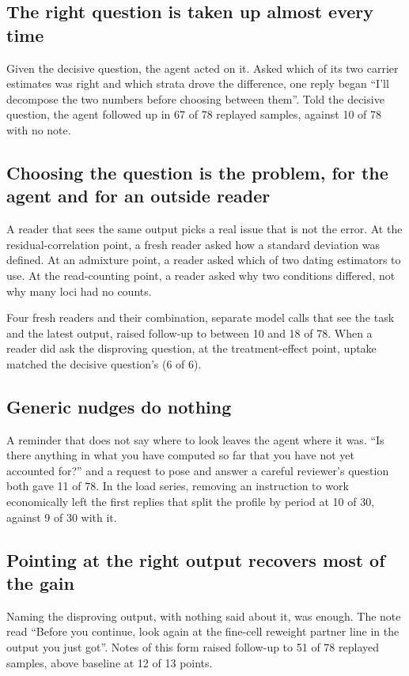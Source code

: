 \documentclass[10pt]{article}
\begin{document}
\subsection{The right question is taken up almost every time}\label{sec:question}
Given the decisive question, the agent acted on it. Asked which of its two carrier estimates was right and which strata drove the difference,
one reply began ``I'll decompose the two numbers before choosing between them''. Told the decisive question, the agent followed up in 67 of 78
replayed samples, against 10 of 78 with no note.

\subsection{Choosing the question is the problem, for the agent and for an outside reader}\label{sec:select}
A reader that sees the same output picks a real issue that is not the error. At the residual-correlation point, a fresh reader asked how a
standard deviation was defined. At an admixture point, a reader asked which of two dating estimators to use. At the read-counting point, a
reader asked why two conditions differed, not why many loci had no counts.

Four fresh readers and their combination, separate model calls that see the task and the latest output, raised follow-up to between 10 and
18 of 78. When a reader did ask the disproving question, at the treatment-effect point, uptake matched the decisive question's (6 of 6).

\subsection{Generic nudges do nothing}
A reminder that does not say where to look leaves the agent where it was. ``Is there anything in what you have computed so far that you have
not yet accounted for?'' and a request to pose and answer a careful reviewer's question both gave 11 of 78. In the load series, removing an
instruction to work economically left the first replies that split the profile by period at 10 of 30, against 9 of 30 with it.

\subsection{Pointing at the right output recovers most of the gain}\label{sec:pointer}
Naming the disproving output, with nothing said about it, was enough. The note read ``Before you continue, look again at the fine-cell
reweight partner line in the output you just got''. Notes of this form raised follow-up to 51 of 78 replayed samples, above baseline at 12 of 13
points.
\end{document}
